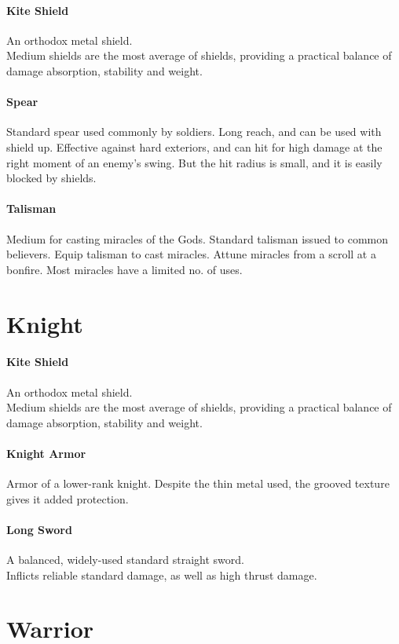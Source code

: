 \documentclass[twocolumn,a4paper]{article}
\begin{document}
\paragraph{Kite Shield}
An orthodox metal shield.\\
Medium shields are the most average of shields, providing a practical balance of damage absorption, stability and weight.
\paragraph{Spear}
Standard spear used commonly by soldiers. Long reach, and can be used with shield up. Effective against hard exteriors, and can hit for high damage at the right moment of an enemy's swing. But the hit radius is small, and it is easily blocked by shields.
\paragraph{Talisman}
Medium for casting miracles of the Gods. Standard talisman issued to common believers. Equip talisman to cast miracles. Attune miracles from a scroll at a bonfire. Most miracles have a limited no. of uses.
\section*{Knight}
\paragraph{Kite Shield}
An orthodox metal shield.\\
Medium shields are the most average of shields, providing a practical balance of damage absorption, stability and weight.
\paragraph{Knight Armor}
Armor of a lower-rank knight. Despite the thin metal used, the grooved texture gives it added protection.
\paragraph{Long Sword}
A balanced, widely-used standard straight sword.\\
Inflicts reliable standard damage, as well as high thrust damage.
\section*{Warrior}
\end{document}
